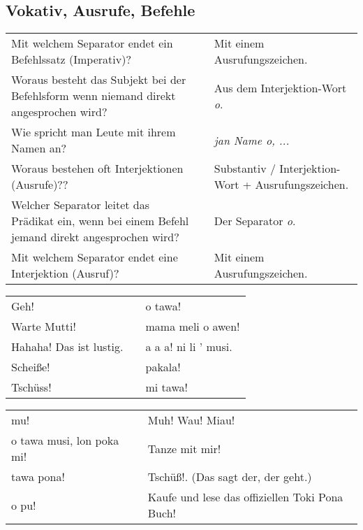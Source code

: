 \newpage
%
\subsection*{Vokativ, Ausrufe, Befehle} 
\label{'commands_interjections'}

\begin{supertabular}{p{5,5cm}|ll}
Mit welchem Separator endet ein Befehlssatz (Imperativ)? && Mit einem Ausrufungszeichen. \\ %
Woraus besteht das Subjekt bei der Befehlsform wenn niemand direkt angesprochen wird? && Aus dem Interjektion-Wort \textit{o}. \\ %
Wie spricht man Leute mit ihrem Namen an? && \textit{jan Name o, ...} \\ %
Woraus bestehen oft Interjektionen (Ausrufe)?? && Substantiv / Interjektion-Wort + Ausrufungszeichen. \\ %
Welcher Separator leitet das Prädikat ein, wenn bei einem Befehl jemand direkt angesprochen wird? && Der Separator \textit{o}. \\ %
Mit welchem Separator endet eine Interjektion (Ausruf)? && Mit einem Ausrufungszeichen. \\ %
\end{supertabular}

\begin{supertabular}{p{5,5cm}|ll}
Geh!  && o tawa! \\ %
Warte Mutti!  && mama meli o awen! \\ %
Hahaha! Das ist lustig.  && a a a! ni li ' musi. \\ %
Scheiße!  && pakala! \\ %
Tschüss!  && mi tawa!  \\ %
\end{supertabular}  

\begin{supertabular}{p{5,5cm}|ll}
mu!  && Muh! Wau! Miau! \\
o tawa musi, lon poka mi!  && Tanze mit mir! \\
tawa pona!  && Tschüß!. (Das sagt der, der geht.) \\
o pu! && Kaufe und lese das offiziellen Toki Pona Buch! \\
\end{supertabular} 

